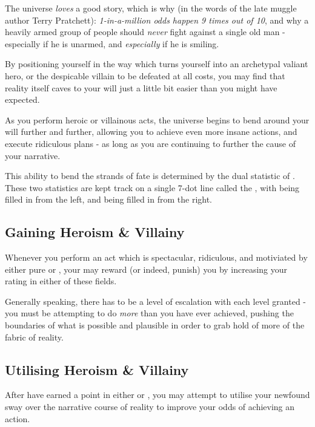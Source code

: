 The universe {\it loves} a good story, which is why (in the words of the late muggle author Terry Pratchett): {\it 1-in-a-million odds happen 9 times out of 10}, and why a heavily armed group of people should {\it never} fight against a single old man - especially if he is unarmed, and {\it especially} if he is smiling. 

By positioning yourself in the way which turns yourself into an archetypal valiant hero, or the despicable villain to be defeated at all costs, you may find that reality itself caves to your will just a little bit easier than you might have expected. 

As you perform heroic or villainous acts, the universe begins to bend around your will further and further, allowing you to achieve even more insane actions, and execute ridiculous plans - as long as you are continuing to further the cause of your narrative. 

This ability to bend the strands of fate is determined by the dual statistic of . These two statistics are kept track on a single 7-dot line called the , with  being filled in from the left, and  being filled in from the right. 

\subsection{Gaining Heroism \& Villainy}

Whenever you perform an act which is spectacular, ridiculous, and motiviated by either pure  or , your  may reward (or indeed, punish) you by increasing your rating in either of these fields. 

Generally speaking, there has to be a level of escalation with each level granted - you must be attempting to do {\it more} than you have ever achieved, pushing the boundaries of what is possible and plausible in order to grab hold of more of the fabric of reality. 

\subsection{Utilising Heroism \& Villainy}

After have earned a point in either  or , you may attempt to utilise your newfound sway over the narrative course of reality to improve your odds of achieving an action. 


